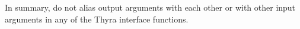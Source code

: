 \documentclass[pdf,ps2pdf,11pt]{SANDreport}
\begin{document}
In summary, do not alias output arguments with each other or with
other input arguments in any of the Thyra interface functions.

%
%
%
\end{document}
